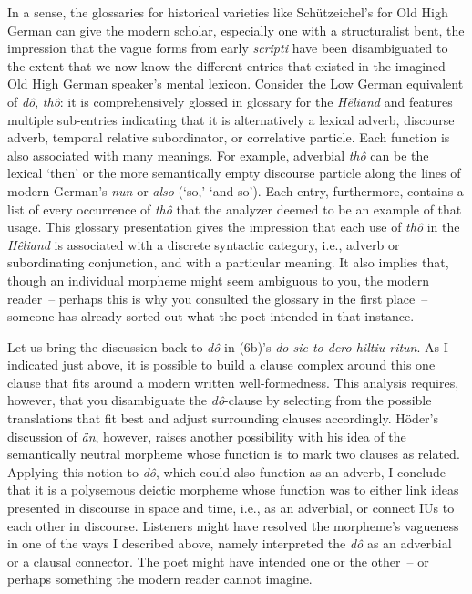 In a sense, the glossaries for historical varieties like Schützeichel’s for Old High German can give the modern scholar, especially one with a structuralist bent, the impression that the vague forms from early \textit{scripti} have been disambiguated to the extent that we now know the different entries that existed in the imagined Old High German speaker’s mental lexicon. Consider the Low German equivalent of \textit{dô}, \textit{thô}: it is comprehensively glossed in  glossary for the \textit{Hêliand} and features multiple sub-entries indicating that it is alternatively a lexical adverb, discourse adverb, temporal relative subordinator, or correlative particle. Each function is also associated with many meanings. For example, adverbial \textit{thô} can be the lexical ‘then’ or the more semantically empty discourse particle along the lines of modern German’s \textit{nun} or \textit{also} (‘so,’ ‘and so’). Each entry, furthermore, contains a list of every occurrence of \textit{thô} that the analyzer deemed to be an example of that usage. This glossary presentation gives the impression that each use of \textit{thô} in the \textit{Hêliand} is associated with a discrete syntactic category, i.e., adverb or subordinating conjunction, and with a particular meaning. It also implies that, though an individual morpheme might seem ambiguous to you, the modern reader~-- perhaps this is why you consulted the glossary in the first place~-- someone has already sorted out what the poet intended in that instance.

Let us bring the discussion back to \textit{dô} in (6b)’s \textit{do sie to dero hiltiu ritun}. As I indicated just above, it is possible to build a clause complex around this one clause that fits around a modern written well-formedness. This analysis requires, however, that you disambiguate the \textit{dô}{}-clause by selecting from the possible translations that fit best and adjust surrounding clauses accordingly. Höder’s discussion of \textit{än}, however, raises another possibility with his idea of the semantically neutral morpheme whose function is to mark two clauses as related. Applying this notion to \textit{dô}, which could also function as an adverb, I conclude that it is a polysemous deictic morpheme whose function was to either link ideas presented in discourse in space and time, i.e., as an adverbial, or connect IUs to each other in discourse. Listeners might have resolved the morpheme’s vagueness in one of the ways I described above, namely interpreted the \textit{dô} as an adverbial or a clausal connector. The poet might have intended one or the other~-- or perhaps something the modern reader cannot imagine.

